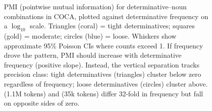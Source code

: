\documentclass[12pt,a4paper]{article}
\begin{document}
\begin{figure}[t]
\begin{tikzpicture}[
    label/.style={font=\small}
]
\end{tikzpicture}
\caption{PMI (pointwise mutual information) for determinative--noun combinations in COCA, plotted against determinative frequency on a $\log_{10}$ scale. Triangles (coral) = tight determinatives; squares (gold) = moderate; circles (blue) = loose. Whiskers show approximate 95\% Poisson CIs where counts exceed 1. If frequency drove the pattern, PMI should increase with determinative frequency (positive slope). Instead, the vertical separation tracks precision class: tight determinatives (triangles) cluster below zero regardless of frequency; loose determinatives (circles) cluster above.  (1.1M tokens) and  (35k tokens) differ 32-fold in frequency but fall on opposite sides of zero.}
\label{fig:pmi}
\end{figure}



\end{document}
